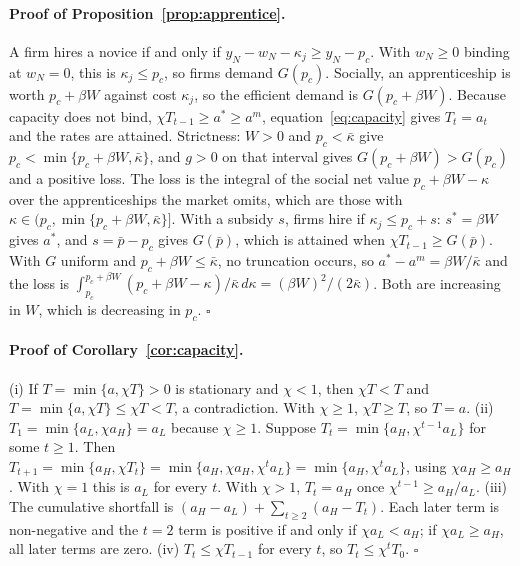 \documentclass[12pt]{article}
\theoremstyle{remark}
\begin{document}
\paragraph{Proof of Proposition~\ref{prop:apprentice}.} A firm hires a novice if and only if $y_N-w_N-\kappa_j\ge y_N-p_c$. With $w_N\ge0$ binding at $w_N=0$, this is $\kappa_j\le p_c$, so firms demand $G(p_c)$. Socially, an apprenticeship is worth $p_c+\beta W$ against cost $\kappa_j$, so the efficient demand is $G(p_c+\beta W)$. Because capacity does not bind, $\chi T_{t-1}\ge a^*\ge a^m$, equation~\eqref{eq:capacity} gives $T_t=a_t$ and the rates are attained. Strictness: $W>0$ and $p_c<\bar\kappa$ give $p_c<\min\{p_c+\beta W,\bar\kappa\}$, and $g>0$ on that interval gives $G(p_c+\beta W)>G(p_c)$ and a positive loss. The loss is the integral of the social net value $p_c+\beta W-\kappa$ over the apprenticeships the market omits, which are those with $\kappa\in(p_c,\min\{p_c+\beta W,\bar\kappa\}]$. With a subsidy $s$, firms hire if $\kappa_j\le p_c+s$: $s^*=\beta W$ gives $a^*$, and $s=\bar p-p_c$ gives $G(\bar p)$, which is attained when $\chi T_{t-1}\ge G(\bar p)$. With $G$ uniform and $p_c+\beta W\le\bar\kappa$, no truncation occurs, so $a^*-a^m=\beta W/\bar\kappa$ and the loss is $\int_{p_c}^{p_c+\beta W}(p_c+\beta W-\kappa)/\bar\kappa\,d\kappa=(\beta W)^2/(2\bar\kappa)$. Both are increasing in $W$, which is decreasing in $p_c$. $\square$

\paragraph{Proof of Corollary~\ref{cor:capacity}.} (i) If $T=\min\{a,\chi T\}>0$ is stationary and $\chi<1$, then $\chi T<T$ and $T=\min\{a,\chi T\}\le\chi T<T$, a contradiction. With $\chi\ge1$, $\chi T\ge T$, so $T=a$. (ii) $T_1=\min\{a_L,\chi a_H\}=a_L$ because $\chi\ge1$. Suppose $T_{t}=\min\{a_H,\chi^{t-1}a_L\}$ for some $t\ge1$. Then $T_{t+1}=\min\{a_H,\chi T_t\}=\min\{a_H,\chi a_H,\chi^{t}a_L\}=\min\{a_H,\chi^{t}a_L\}$, using $\chi a_H\ge a_H$. With $\chi=1$ this is $a_L$ for every $t$. With $\chi>1$, $T_t=a_H$ once $\chi^{t-1}\ge a_H/a_L$. (iii) The cumulative shortfall is $(a_H-a_L)+\sum_{t\ge2}(a_H-T_t)$. Each later term is non-negative and the $t=2$ term is positive if and only if $\chi a_L<a_H$; if $\chi a_L\ge a_H$, all later terms are zero. (iv) $T_t\le\chi T_{t-1}$ for every $t$, so $T_t\le\chi^tT_0$. $\square$
\end{document}
